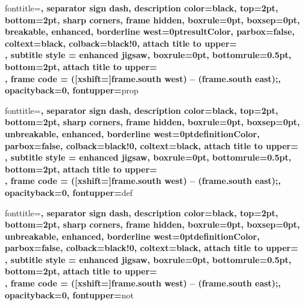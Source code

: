     {\begin{tcblemma}{#1}{#2}}{\end{tcblemma}}
%
     {fonttitle=\sffamily\bfseries\color{resultColor},
      separator sign dash, description color=black,
      top=2pt, bottom=2pt,
      sharp corners,
      frame hidden, boxrule=0pt, boxsep=0pt, breakable,
      enhanced, borderline west={\the\tcbBorderWidth}{0pt}{resultColor},
      parbox=false,
      coltext=black,
      colback=black!0,
      attach title to upper={\\},
      subtitle style = {enhanced jigsaw, boxrule=0pt, bottomrule=0.5pt, bottom=2pt,
      attach title to upper={\\},
      frame code = { ([xshift=\the\tcbBorderWidth]frame.south west) -- (frame.south east);}, 
      opacityback=0, fontupper=\color{black}}}{prop}
    {\begin{tcbproposition}{#1}{#2}}{\end{tcbproposition}}
%
     {fonttitle=\sffamily\bfseries\color{definitionColor},
      separator sign dash, description color=black,
      top=2pt, bottom=2pt,
      sharp corners,
      frame hidden, boxrule=0pt, boxsep=0pt, unbreakable,
      enhanced, borderline west={\the\tcbBorderWidth}{0pt}{definitionColor},
      parbox=false,
      colback=black!0,
      coltext=black,
      attach title to upper={\\},
      subtitle style = {enhanced jigsaw, boxrule=0pt, bottomrule=0.5pt, bottom=2pt,
      attach title to upper={\\},
      frame code = { ([xshift=\the\tcbBorderWidth]frame.south west) -- (frame.south east);}, 
      opacityback=0, fontupper=\color{black}}}{def}
    {\begin{tcbdef}{#1}{#2}}{\end{tcbdef}}
%
     {fonttitle=\sffamily\bfseries\color{definitionColor},
      separator sign dash, description color=black,
      top=2pt, bottom=2pt,
      sharp corners,
      frame hidden, boxrule=0pt, boxsep=0pt, unbreakable,
      enhanced, borderline west={\the\tcbBorderWidth}{0pt}{definitionColor},
      parbox=false,
      colback=black!0,
      coltext=black,
      attach title to upper={\\},
      subtitle style = {enhanced jigsaw, boxrule=0pt, bottomrule=0.5pt, bottom=2pt,
      attach title to upper={\\},
      frame code = { ([xshift=\the\tcbBorderWidth]frame.south west) -- (frame.south east);},
      opacityback=0, fontupper=\color{black}}}{not}
